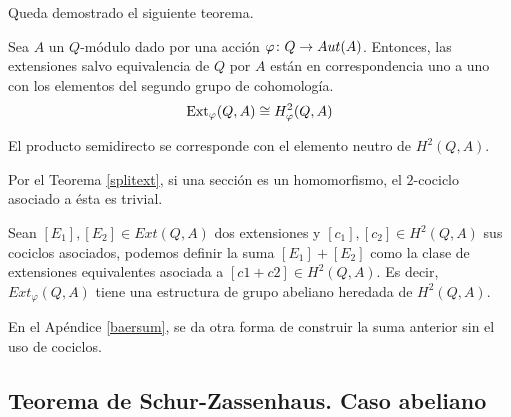Queda demostrado el siguiente teorema. %

\begin{teorema}\label{h2}
	Sea $A$ un $Q$-módulo dado por una acción $\varphi\colon Q\to Aut(A)$. Entonces, las extensiones salvo equivalencia de $Q$ por $A$ están en correspondencia uno a uno con los elementos del segundo grupo de cohomología.
	\begin{equation*}
		\operatorname{Ext}_{\varphi}(Q,A)\cong H^2_{\varphi}(Q,A)
	\end{equation*}
\end{teorema}

\begin{observacion}\label{obs:split}
	El producto semidirecto se corresponde con el elemento neutro de $H^2(Q,A)$.
	\begin{demostracion}
		Por el Teorema \ref{splitext}, si una sección es un homomorfismo, el $2$-cociclo asociado a ésta es trivial.
	\end{demostracion}
\end{observacion}

\begin{proposicion}\label{extsum}
	Sean $[E_1],[E_2]\in Ext(Q,A)$ dos extensiones y $[c_1],[c_2]\in H^2(Q,A)$ sus cociclos asociados, podemos definir la suma $[E_1] + [E_2]$ como la clase de extensiones equivalentes asociada a $[c1+c2]\in H^2(Q,A)$. Es decir, $Ext_\varphi(Q,A)$ tiene una estructura de grupo abeliano heredada de $H^2(Q,A)$.
\end{proposicion}

En el Apéndice \ref{baersum}, se da otra forma de construir la suma anterior sin el uso de cociclos.

\subsection{Teorema de Schur-Zassenhaus. Caso abeliano}



